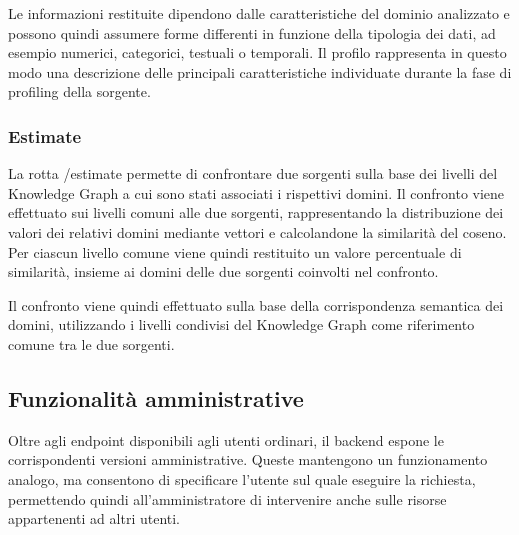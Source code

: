 \documentclass[13.6pt,a4paper]{report}
\begin{document}
\noindent
Le informazioni restituite dipendono dalle caratteristiche del dominio analizzato e possono quindi assumere forme differenti in funzione della tipologia dei dati, ad esempio numerici, categorici, testuali o temporali. Il profilo rappresenta in questo modo una descrizione delle principali caratteristiche individuate durante la fase di profiling della sorgente.


\subsubsection*{Estimate}
La rotta \colorbox{gray!15}{/estimate} permette di confrontare due sorgenti sulla base dei livelli del Knowledge Graph a cui sono stati associati i rispettivi domini. Il confronto viene effettuato sui livelli comuni alle due sorgenti, rappresentando la distribuzione dei valori dei relativi domini mediante vettori e calcolandone la similarità del coseno. Per ciascun livello comune viene quindi restituito un valore percentuale di similarità, insieme ai domini delle due sorgenti coinvolti nel confronto.

\noindent
Il confronto viene quindi effettuato sulla base della corrispondenza semantica dei domini, utilizzando i livelli condivisi del Knowledge Graph come riferimento comune tra le due sorgenti.


\subsection{Funzionalità amministrative}



\noindent
Oltre agli endpoint disponibili agli utenti ordinari, il backend espone le corrispondenti versioni amministrative. Queste mantengono un funzionamento analogo, ma consentono di specificare l'utente sul quale eseguire la richiesta, permettendo quindi all'amministratore di intervenire anche sulle risorse appartenenti ad altri utenti.
\end{document}
